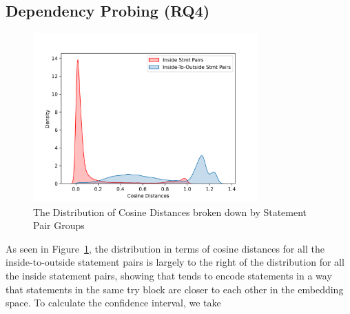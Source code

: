 \subsection{Dependency Probing (RQ4)}
\label{sec:rq4}

\begin{figure}[t]
 	\centering
 	\includegraphics[width=3.4in]{rq4-density.png}
        \vspace{-20pt}
 	\caption{The Distribution of Cosine Distances broken down by Statement Pair Groups}
 	\label{fig:rq4-density}	
\end{figure}

As seen in Figure~\ref{fig:rq4-density}, the distribution in terms of cosine distances for all the inside-to-outside statement pairs is largely to the right of the distribution for all the inside statement pairs, showing that {\tool} tends to encode statements in a way that statements in the same try block are closer to each other in the embedding space. To calculate the confidence interval, we take 